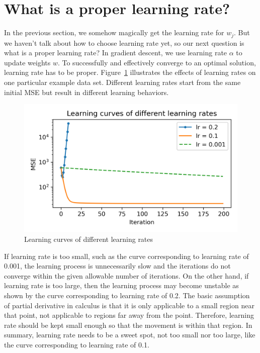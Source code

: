 \documentclass[
	letterpaper
]{article}
\begin{document}
\section{What is a proper learning rate?}
In the previous section, we somehow magically get the learning rate for $w_j$.
But we haven't talk about how to choose learning rate yet, so our next question is what is a proper learning rate?
In gradient descent, we use learning rate $\alpha$ to update weights $w$.
To successfully and effectively converge to an optimal solution, learning rate has to be proper.
Figure~\ref{fig:difflr} illustrates the effects of learning rates on one particular example data set.
Different learning rates start from the same initial MSE but result in different learning behaviors.
\begin{figure}[htbp]
	\centering
	\includegraphics[width=3.5 in]{figures/diff-learning-rates.png}
	\caption{Learning curves of different learning rates}
	\label{fig:difflr}
\end{figure}

If learning rate is too small, such as the curve corresponding to learning rate of 0.001, the learning process is unnecessarily slow and the iterations do not converge within the given allowable number of iterations.
On the other hand, if learning rate is too large, then the learning process may become unstable as shown by the curve corresponding to learning rate of 0.2.
The basic assumption of partial derivative in calculus is that it is only applicable to a small region near that point, not applicable to regions far away from the point.
Therefore, learning rate should be kept small enough so that the movement is within that region.
In summary, learning rate needs to be a sweet spot, not too small nor too large, like the curve corresponding to learning rate of 0.1.
\end{document}
